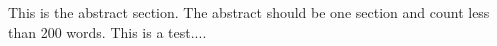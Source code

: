 This is the abstract section. The abstract should be one section and count less than 200 words. This is a test....